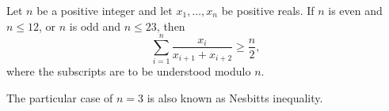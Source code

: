 \documentclass[12pt]{article}
\begin{document}
Let $n$ be a positive integer and let $x_1,\ldots,x_n$ be positive reals.
If $n$ is even and $n \leq 12$, or $n$ is odd and $n \leq 23$, then
$$\sum_{i=1}^n \frac{x_i}{x_{i+1}+x_{i+2}} \geq \frac{n}{2},$$
where the subscripts are to be understood modulo $n$.

The particular case of $n=3$ is also known as Nesbitts inequality.
\end{document}
